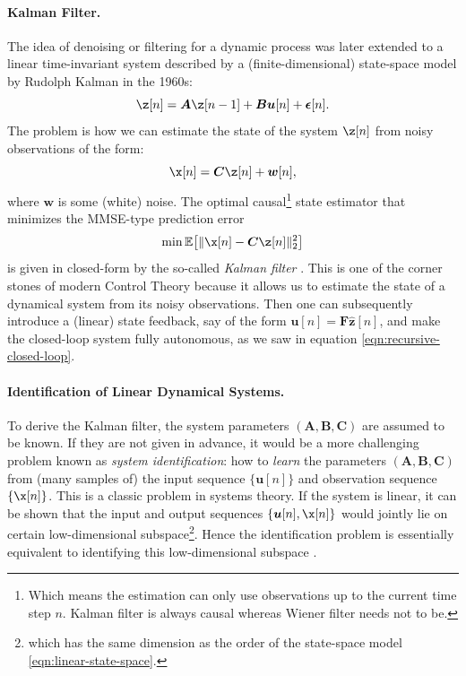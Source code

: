 \documentclass[../../book-main.tex]{subfiles}
\begin{document}
\paragraph{Kalman Filter.} 
The idea of denoising or filtering for a dynamic process was later extended to a linear time-invariant system described by a (finite-dimensional) state-space model by Rudolph Kalman in the 1960s:
\begin{equation}
    \z[n] = \boldsymbol{A} \z[n-1] + \boldsymbol{B}\boldsymbol{u}[n] + \boldsymbol{\epsilon}[n]. 
    \label{eqn:linear-state-space}
\end{equation}
The problem is how we can estimate the state of the system $\z[n]$ from noisy observations of the form: \begin{equation}\x[n] = \boldsymbol{C} \z[n] + \boldsymbol{w}[n],
\label{eqn:Kalman-model}
\end{equation}
where $\boldsymbol{w}$ is some (white) noise. The optimal causal\footnote{Which means the estimation can only use observations up to the current  time step $n$. Kalman filter is always causal whereas Wiener filter needs not to be.} state  estimator that minimizes the MMSE-type prediction error
\begin{equation}
    \min \mathbb{E}\big[ \|\x[n] - \boldsymbol{C}\z[n]\|_2^2\big]
\end{equation}
is given in closed-form by the so-called {\em Kalman filter} \cite{kalman1960new}. This is one of the corner stones of modern Control Theory because it allows us to estimate the state of a dynamical system from its noisy observations. Then one can subsequently introduce a (linear) state feedback, say of the form $\boldsymbol{u}[n] = \boldsymbol{F} \hat{\boldsymbol{z}}[n]$, and make the closed-loop system fully autonomous, as we saw in equation \eqref{eqn:recursive-closed-loop}. 

\paragraph{Identification of Linear Dynamical Systems.}
To derive the Kalman filter, the system parameters $(\boldsymbol{A}, \boldsymbol{B}, \boldsymbol{C})$ are assumed to be known. If they are not given in advance, it would be a more challenging problem known as {\em system identification}: how to {\em learn} the parameters $(\boldsymbol{A}, \boldsymbol{B}, \boldsymbol{C})$ from (many samples of) the input sequence $\{\boldsymbol{u}[n]\}$ and observation sequence $\{\x[n]\}$. This is a classic problem in systems theory. If the system is linear, it can be shown that the input and output sequences $\{\boldsymbol{u}[n], \x[n]\}$ would jointly lie on certain low-dimensional subspace\footnote{which has the same dimension as the order of the state-space model \eqref{eqn:linear-state-space}. }. Hence the identification problem is essentially equivalent to identifying this low-dimensional subspace \cite{OverscheeP1996,Liu-2009-CDC,Liu-2010-SIAM}. 
\end{document}
